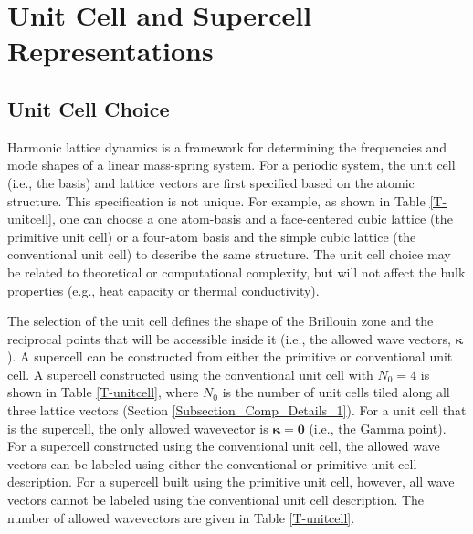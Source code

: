 


\section{\label{A:unitcell}Unit Cell and Supercell Representations}

\subsection{\label{A:unitcell:unitcell}Unit Cell Choice}

Harmonic lattice dynamics is a framework for determining the frequencies 
and mode shapes of a linear mass-spring system. For a periodic system, 
the unit cell (i.e., the basis) and lattice vectors are first specified 
based on the atomic structure. This specification is not unique. For 
example, as shown in Table \ref{T-unitcell}, one can choose a one 
atom-basis and a face-centered cubic lattice (the primitive unit cell) 
or a four-atom basis and the simple cubic lattice (the conventional unit 
cell) to describe the same structure. The unit cell choice may be related 
to theoretical or computational complexity, but will not affect the bulk 
properties (e.g., heat capacity or thermal conductivity).

The selection of the unit cell defines the shape of the Brillouin zone 
and the reciprocal points that will be accessible inside it 
(i.e., the allowed wave vectors, $\pmb{\kappa}$). 
A supercell can be constructed from either the primitive or conventional 
unit cell. A supercell constructed using the conventional unit cell 
with $N_0 = 4$ is shown in Table \ref{T-unitcell}, where $N_0$ is the 
number of unit cells tiled along all three lattice vectors 
(Section \ref{Subsection_Comp_Details_1}). 
For a unit cell that is the supercell, the only allowed 
wavevector is $\mathbf{\kappa} = \mathbf{0}$ (i.e., the Gamma point). 
For a supercell 
constructed using the conventional unit cell, the allowed wave 
vectors can be labeled using either the conventional or primitive unit 
cell description.  For a supercell built using the primitive unit cell, 
however, all wave vectors cannot be labeled using the conventional unit 
cell description. The number of allowed wavevectors are given 
in Table \ref{T-unitcell}.

